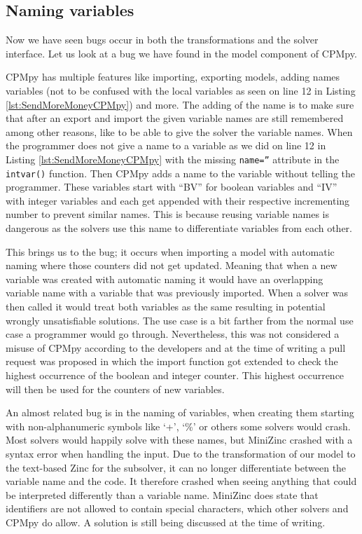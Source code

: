 \subsection{Naming variables}
\label{res:bug:Naming+andImport}
Now we have seen bugs occur in both the transformations and the solver interface. Let us look at a bug we have found in the model component of CPMpy. 

CPMpy has multiple features like importing, exporting models, adding names variables (not to be confused with the local variables as seen on line 12 in Listing \ref{lst:SendMoreMoneyCPMpy}) and more. The adding of the name is to make sure that after an export and import the given variable names are still remembered among other reasons, like to be able to give the solver the variable names. When the programmer does not give a name to a variable as we did on line 12 in Listing \ref{lst:SendMoreMoneyCPMpy} with the missing \texttt{name=''} attribute in the \texttt{intvar()} function. Then CPMpy adds a name to the variable without telling the programmer. These variables start with “BV” for boolean variables and “IV” with integer variables and each get appended with their respective incrementing number to prevent similar names. This is because reusing variable names is dangerous as the solvers use this name to differentiate variables from each other.

This brings us to the bug; it occurs when importing a model with automatic naming where those counters did not get updated. Meaning that when a new variable was created with automatic naming it would have an overlapping variable name with a variable that was previously imported. When a solver was then called it would treat both variables as the same resulting in potential wrongly unsatisfiable solutions. The use case is a bit farther from the normal use case a programmer would go through. Nevertheless, this was not considered a misuse of CPMpy according to the developers and at the time of writing a pull request was proposed in which the import function got extended to check the highest occurrence of the boolean and integer counter. This highest occurrence will then be used for the counters of new variables.

An almost related bug is in the naming of variables, when creating them starting with non-alphanumeric symbols like ‘+’, ‘\%’ or others some solvers would crash. Most solvers would happily solve with these names, but MiniZinc crashed with a syntax error when handling the input. Due to the transformation of our model to the text-based Zinc for the subsolver, it can no longer differentiate between the variable name and the code. It therefore crashed when seeing anything that could be interpreted differently than a variable name. MiniZinc does state that identifiers are not allowed to contain special characters, which other solvers and CPMpy do allow. A solution is still being discussed at the time of writing.


